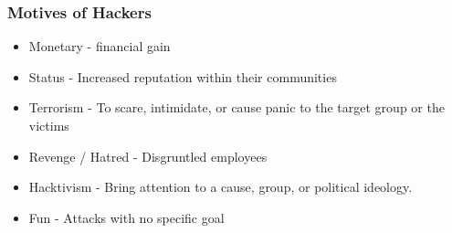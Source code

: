 \subsubsection{Motives of Hackers}
\begin{itemize}
    \item Monetary - financial gain
    \item Status - Increased reputation within their communities
    \item Terrorism - To scare, intimidate, or cause panic to the target group or the victims
    \item Revenge / Hatred - Disgruntled employees
    \item Hacktivism - Bring attention to a cause, group, or political ideology.
    \item Fun - Attacks with no specific goal
\end{itemize}


